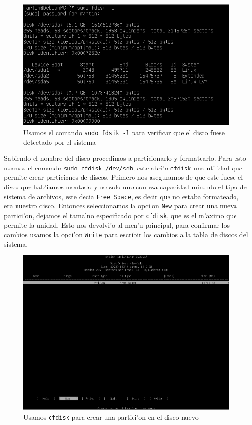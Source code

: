 \documentclass[11pt]{article}
\begin{document}
		\begin{figure}[H]
    			\centering
    			\includegraphics[scale=0.55]{Images/rsync/rsync_disk_info.PNG}
    			\caption{Usamos el comando \texttt{sudo fdsik -l} para verificar que el disco fuese detectado por el sistema}
    			\label{fig:rsync_disk_info}
		\end{figure}

		Sabiendo el nombre del disco procedimos a particionarlo y formatearlo. Para esto usamos el comando \texttt{sudo cfdisk /dev/sdb}, este abri'o \texttt{cfdisk} una utilidad que permite crear particiones de discos. Primero nos aseguramos de que este fuese el disco que hab'iamos montado y no solo uno con esa capacidad mirando el tipo de sistema de archivos, este decia \texttt{Free Space}, es decir que no estaba formateado, era nuestro disco. Entonces seleccionamos la opci'on \texttt{New} para crear una nueva partici'on, dejamos el tama'no especificado por \texttt{cfdisk}, que es el m'aximo que permite la unidad. Esto nos devolvi'o al men'u principal, para confirmar los cambios usamos la opci'on \texttt{Write} para escribir los cambios a la tabla de discos del sistema. 

		\begin{figure}[H]
    			\centering
    			\includegraphics[scale=0.40]{Images/rsync/rsync_disk_partition.PNG}
    			\caption{Usamos \texttt{cfdisk} para crear una partici'on en el disco nuevo}
    			\label{fig:rsync_disk_partition}
		\end{figure}
\end{document}
